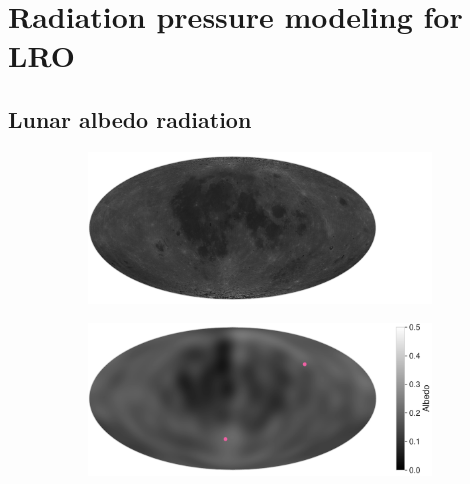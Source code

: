 \section{Radiation pressure modeling for LRO}

\subsection{Lunar albedo radiation}
\label{subsec:lunar-albedo}

\begin{figure}[t]
    \centering

    \begin{subfigure}[c]{0.49\textwidth}
        \includegraphics[width=\textwidth]{figures/plots/lunar_map_photo.pdf}
        \subcaption{}
        \label{fig:lunar-albedo-map-photo}
    \end{subfigure}
    \hfill
    \begin{subfigure}[c]{0.49\textwidth}
        \includegraphics[width=\textwidth]{figures/plots/lunar_map_dlam1.pdf}
        \subcaption{}
        \label{fig:lunar-albedo-map-dlam1}
    \end{subfigure}

    \bigskip


\end{figure}

